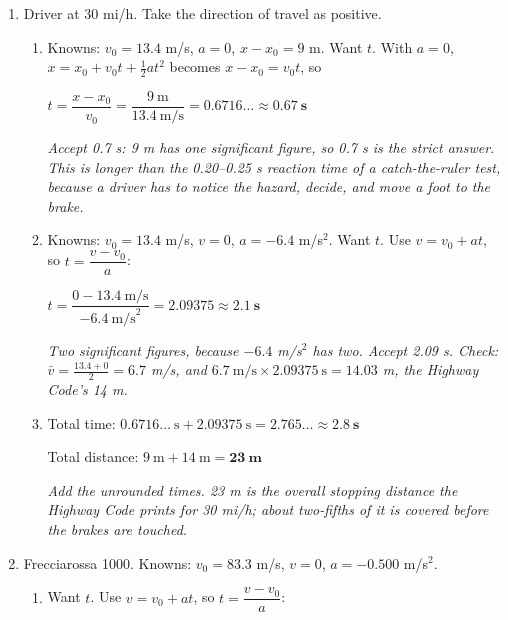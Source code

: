 \documentclass[12pt, twoside]{article}
\begin{document}
\begin{enumerate}[itemsep=0.5cm]
\begin{enumerate}[itemsep=0.3cm]
      $x - x_0 = 8.40~\text{m/s} \times 14.0~\text{s} = 117.6
      \approx \mathbf{118~\textbf{m}}$

      \emph{Also accept $v^2 = v_0^2 + 2a(x - x_0)$:
      $x - x_0 = \frac{(16.8)^2}{2(1.20)} = \frac{282.24}{2.40} = 117.6$ m, or
      $\frac{1}{2}at^2 = \frac{1}{2}(1.20)(14.0)^2 = 117.6$ m.}
  \end{enumerate}

\newpage

\item Driver at 30 mi/h. Take the direction of travel as positive.
  \begin{enumerate}[itemsep=0.3cm]
    \item Knowns: $v_0 = 13.4$ m/s, $a = 0$, $x - x_0 = 9$ m. Want $t$. With
      $a = 0$, $x = x_0 + v_0 t + \frac{1}{2}at^2$ becomes $x - x_0 = v_0 t$, so

      $t = \dfrac{x - x_0}{v_0} = \dfrac{9~\text{m}}{13.4~\text{m/s}} = 0.6716\ldots
      \approx \mathbf{0.67~\textbf{s}}$

      \emph{Accept 0.7 s: 9 m has one significant figure, so 0.7 s is the strict
      answer. This is longer than the 0.20--0.25 s reaction time of a catch-the-ruler
      test, because a driver has to notice the hazard, decide, and move a foot to the
      brake.}
    \item Knowns: $v_0 = 13.4$ m/s, $v = 0$, $a = -6.4$ m/s$^2$. Want $t$. Use
      $v = v_0 + at$, so $t = \dfrac{v - v_0}{a}$:

      $t = \dfrac{0 - 13.4~\text{m/s}}{-6.4~\text{m/s}^2} = 2.09375
      \approx \mathbf{2.1~\textbf{s}}$

      \emph{Two significant figures, because $-6.4$ m/s$^2$ has two. Accept 2.09 s.
      Check: $\bar{v} = \frac{13.4 + 0}{2} = 6.7$ m/s, and
      $6.7~\text{m/s} \times 2.09375~\text{s} = 14.03$ m, the Highway Code's 14 m.}
    \item Total time: $0.6716\ldots~\text{s} + 2.09375~\text{s} = 2.765\ldots
      \approx \mathbf{2.8~\textbf{s}}$

      Total distance: $9~\text{m} + 14~\text{m} = \mathbf{23~\textbf{m}}$

      \emph{Add the unrounded times. 23 m is the overall stopping distance the
      Highway Code prints for 30 mi/h; about two-fifths of it is covered before
      the brakes are touched.}
  \end{enumerate}

\item Frecciarossa 1000. Knowns: $v_0 = 83.3$ m/s, $v = 0$, $a = -0.500$ m/s$^2$.
  \begin{enumerate}[itemsep=0.3cm]
    \item Want $t$. Use $v = v_0 + at$, so $t = \dfrac{v - v_0}{a}$:


\end{enumerate}
\end{enumerate}
\end{document}
